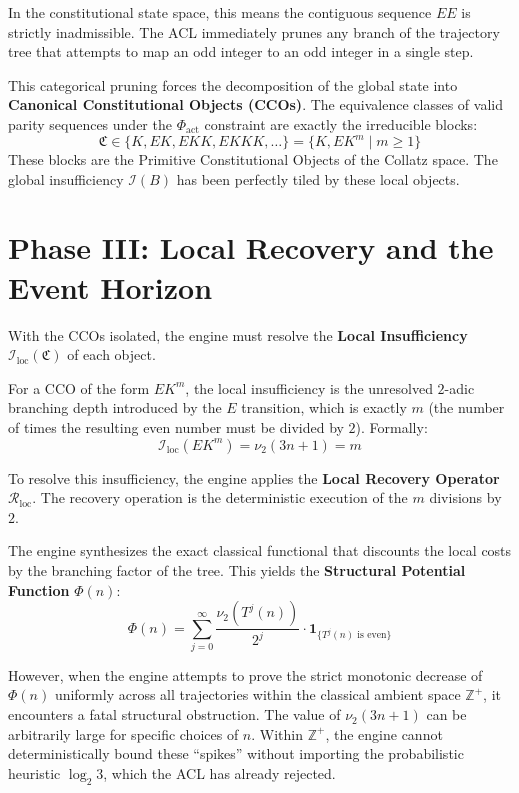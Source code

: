 \documentclass[12pt,openany]{extbook}
\theoremstyle{plain}
\theoremstyle{definition}
\begin{document}
In the constitutional state space, this means the contiguous sequence $EE$ is strictly inadmissible. The ACL immediately prunes any branch of the trajectory tree that attempts to map an odd integer to an odd integer in a single step.

This categorical pruning forces the decomposition of the global state into \textbf{Canonical Constitutional Objects (CCOs)}. The equivalence classes of valid parity sequences under the $\Phi_{\mathrm{act}}$ constraint are exactly the irreducible blocks:
\[
\mathfrak{C} \in \{ K, EK, EKK, EKKK, \dots \} = \{ K, EK^m \mid m \ge 1 \}
\]
These blocks are the Primitive Constitutional Objects of the Collatz space. The global insufficiency $\mathcal{I}(B)$ has been perfectly tiled by these local objects.

\section{Phase III: Local Recovery and the Event Horizon}

With the CCOs isolated, the engine must resolve the \textbf{Local Insufficiency} $\mathcal{I}_{\mathrm{loc}}(\mathfrak{C})$ of each object.

For a CCO of the form $EK^m$, the local insufficiency is the unresolved $2$-adic branching depth introduced by the $E$ transition, which is exactly $m$ (the number of times the resulting even number must be divided by $2$). Formally:
\[
\mathcal{I}_{\mathrm{loc}}(EK^m) = \nu_2(3n+1) = m
\]

To resolve this insufficiency, the engine applies the \textbf{Local Recovery Operator} $\mathcal{R}_{\mathrm{loc}}$. The recovery operation is the deterministic execution of the $m$ divisions by $2$.

The engine synthesizes the exact classical functional that discounts the local costs by the branching factor of the tree. This yields the \textbf{Structural Potential Function} $\Phi(n)$:
\[
\Phi(n) = \sum_{j=0}^{\infty} \frac{\nu_2(T^j(n))}{2^j} \cdot \mathbf{1}_{\{T^j(n) \text{ is even}\}}
\]

However, when the engine attempts to prove the strict monotonic decrease of $\Phi(n)$ uniformly across all trajectories within the classical ambient space $\mathbb{Z}^+$, it encounters a fatal structural obstruction. The value of $\nu_2(3n+1)$ can be arbitrarily large for specific choices of $n$. Within $\mathbb{Z}^+$, the engine cannot deterministically bound these ``spikes'' without importing the probabilistic heuristic $\log_2 3$, which the ACL has already rejected.
\end{document}
